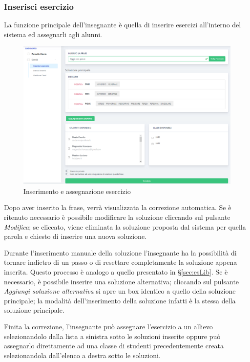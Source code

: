         \subsubsection{Inserisci esercizio}
          La funzione principale dell'insegnante è quella di inserire esercizi all'interno del sistema ed assegnarli agli alunni.
        	\begin{figure}[H]
            	\centering
        		\includegraphics[width=17cm]{sez/img/insegnante/inserisciEsercizio.PNG} 
            	\caption{Inserimento e assegnazione esercizio}\label{fig:1}
        	\end{figure}
        
         
          Dopo aver inserito la frase, verrà visualizzata la correzione automatica. Se è ritenuto necessario è possibile modificare la soluzione cliccando sul pulsante \textit{Modifica}; se cliccato, viene eliminata la soluzione proposta dal sistema per quella parola e chiesto di inserire una nuova soluzione. 
          
          Durante l'inserimento manuale della soluzione l'insegnante ha la possibilità di tornare indietro di un passo o di resettare completamente la soluzione appena inserita. Questo processo è analogo a quello presentato in \S\ref{sec:esLib}. 
          Se è necessario, è possibile inserire una soluzione alternativa; cliccando sul pulsante \textit{Aggiungi soluzione alternativa} si apre un box identico a quello della soluzione principale; la modalità dell'inserimento della soluzione infatti è la stessa della soluzione principale. 
          
           Finita la correzione, l'insegnante può assegnare l'esercizio a un allievo selezionandolo dalla lista a sinistra sotto le soluzioni inserite oppure può assegnarlo direttamente ad una classe di studenti precedentemente creata selezionandola dall'elenco a destra sotto le soluzioni. 
          
